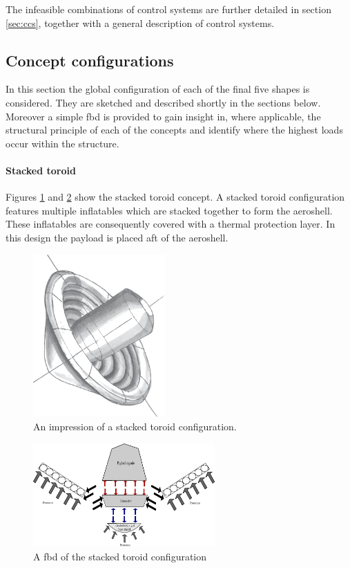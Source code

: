 The infeasible combinations of control systems are further detailed in section \ref{sec:ccs}, together with a general description of control systems. 

\subsection{Concept configurations} \label{sec:conf}
In this section the global configuration of each of the final five shapes is considered. They are sketched  and described shortly in the sections below. Moreover a simple \gls{fbd} is provided to gain insight in, where applicable, the structural principle of each of the concepts and identify where the highest loads occur within the structure.

\paragraph{Stacked toroid}

Figures \ref{fig:conc_stacked} and \ref{fig:fbd_stacked} show the stacked toroid concept. A stacked toroid configuration features multiple inflatables which are stacked together to form the aeroshell. These inflatables are consequently covered with a thermal protection layer. In this design the payload is placed aft of the aeroshell.

\begin{figure}[H]
\centering
\includegraphics[width = 0.45\textwidth]{Figure/stacked_toroid.eps}
\caption[An impression of a stacked toroid configuration.]{An impression of a stacked toroid configuration.}
\label{fig:conc_stacked}
\end{figure}

\begin{figure}[H]
\centering
\includegraphics[width = 0.62\textwidth]{Figure/FBD_stacked.eps}
\caption{A \gls{fbd} of the stacked toroid configuration}
\label{fig:fbd_stacked}
\end{figure}

